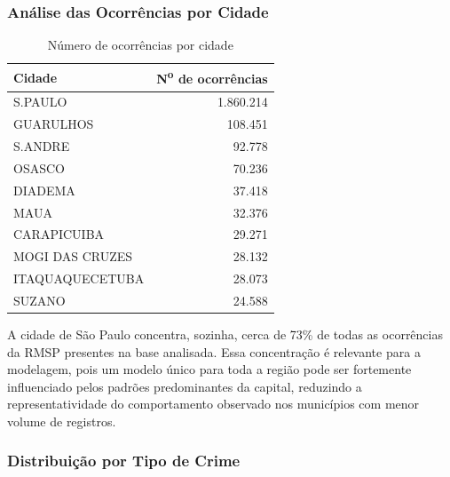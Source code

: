 \documentclass[12pt]{article}
\begin{document}
\subsubsection{Análise das Ocorrências por Cidade}

\begin{table}[h!]
    \centering
    \begin{tabular}{|l|r|}
        \hline
        \textbf{Cidade} & \textbf{N\textsuperscript{o} de ocorrências} \\
        \hline
        S.PAULO          & 1.860.214 \\
        \hline
        GUARULHOS        & 108.451   \\
        \hline
        S.ANDRE          & 92.778    \\
        \hline
        OSASCO           & 70.236    \\
        \hline
        DIADEMA          & 37.418    \\
        \hline
        MAUA             & 32.376    \\
        \hline
        CARAPICUIBA      & 29.271    \\
        \hline
        MOGI DAS CRUZES  & 28.132    \\
        \hline
        ITAQUAQUECETUBA  & 28.073    \\
        \hline
        SUZANO           & 24.588    \\
        \hline
    \end{tabular}
    \caption{Número de ocorrências por cidade}
    \label{tab:ocorrencias-cidade}
\end{table}

A cidade de São Paulo concentra, sozinha, cerca de 73\% de todas as ocorrências da RMSP presentes na base analisada. Essa concentração é relevante para a modelagem, pois um modelo único para toda a região pode ser fortemente influenciado pelos padrões predominantes da capital, reduzindo a representatividade do comportamento observado nos municípios com menor volume de registros.

\subsubsection{Distribuição por Tipo de Crime}
\end{document}
